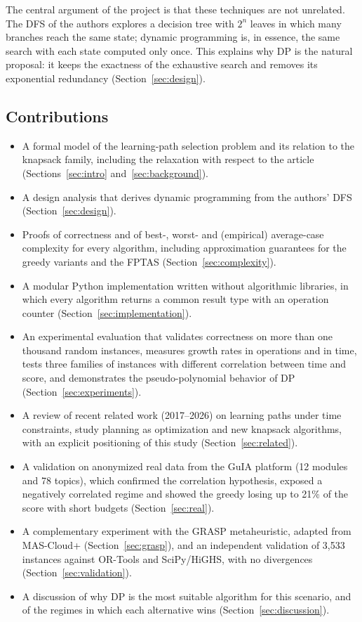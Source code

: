 The central argument of the project is that these techniques are not unrelated. The DFS of the authors explores a decision tree with $2^n$ leaves in which many branches reach the same state; dynamic programming is, in essence, the same search with each state computed only once. This explains why DP is the natural proposal: it keeps the exactness of the exhaustive search and removes its exponential redundancy (Section~\ref{sec:design}).

\subsection{Contributions}

\begin{itemize}[leftmargin=1.4em,itemsep=2pt]
\item A formal model of the learning-path selection problem and its relation to the knapsack family, including the relaxation with respect to the article (Sections~\ref{sec:intro} and~\ref{sec:background}).
\item A design analysis that derives dynamic programming from the authors' DFS (Section~\ref{sec:design}).
\item Proofs of correctness and of best-, worst- and (empirical) average-case complexity for every algorithm, including approximation guarantees for the greedy variants and the FPTAS (Section~\ref{sec:complexity}).
\item A modular Python implementation written without algorithmic libraries, in which every algorithm returns a common result type with an operation counter (Section~\ref{sec:implementation}).
\item An experimental evaluation that validates correctness on more than one thousand random instances, measures growth rates in operations and in time, tests three families of instances with different correlation between time and score, and demonstrates the pseudo-polynomial behavior of DP (Section~\ref{sec:experiments}).
\item A review of recent related work (2017--2026) on learning paths under time constraints, study planning as optimization and new knapsack algorithms, with an explicit positioning of this study (Section~\ref{sec:related}).
\item A validation on anonymized real data from the GuIA platform (12 modules and 78 topics), which confirmed the correlation hypothesis, exposed a negatively correlated regime and showed the greedy losing up to 21\% of the score with short budgets (Section~\ref{sec:real}).
\item A complementary experiment with the GRASP metaheuristic, adapted from MAS-Cloud+ (Section~\ref{sec:grasp}), and an independent validation of 3,533 instances against OR-Tools and SciPy/HiGHS, with no divergences (Section~\ref{sec:validation}).
\item A discussion of why DP is the most suitable algorithm for this scenario, and of the regimes in which each alternative wins (Section~\ref{sec:discussion}).
\end{itemize}

